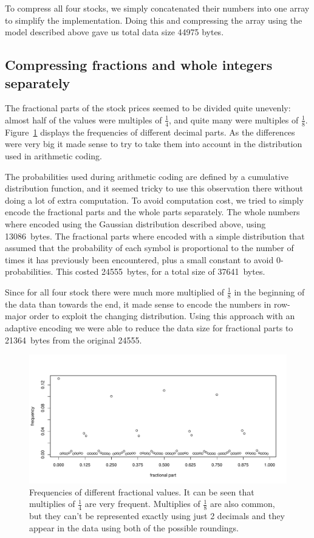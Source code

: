 \documentclass{article}
\begin{document}
To compress all four stocks, we simply concatenated their numbers into one array to simplify the implementation.
Doing this and compressing the array using the model described above gave us total data size 44975 bytes.

\subsection{Compressing fractions and whole integers separately}

The fractional parts of the stock prices seemed to be divided quite unevenly: almost half of the values were multiples of $\frac{1}{4}$, and quite many were multiples of $\frac{1}{8}$.
Figure~\ref{fig:frac} displays the frequencies of different decimal parts.
As the differences were very big it made sense to try to take them into account in the distribution used in arithmetic coding.

The probabilities used during arithmetic coding are defined by a cumulative distribution function, and it seemed tricky to use this observation there without doing a lot of extra computation.
To avoid computation cost, we tried to simply encode the fractional parts and the whole parts separately.
The whole numbers where encoded using the Gaussian distribution described above, using 13086~bytes.
The fractional parts where encoded with a simple distribution that assumed that the probability of each symbol is proportional to the number of times it has previously been encountered, plus a small constant to avoid 0-probabilities.
This costed 24555~bytes, for a total size of 37641~bytes.

Since for all four stock there were much more multiplied of $\frac{1}{8}$ in the beginning of the data than towards the end, it made sense to encode the numbers in row-major order to exploit the changing distribution.
Using this approach with an adaptive encoding we were able to reduce the data size for fractional parts to 21364~bytes from the original 24555.

\begin{figure}
	\includegraphics[scale=0.5]{frac.pdf}
	\caption{Frequencies of different fractional values. It can be seen that multiplies of $\frac{1}{4}$ are very frequent. Multiplies of $\frac{1}{8}$ are also common, but they can't be represented exactly using just 2 decimals and they appear in the data using both of the possible roundings.}
	\label{fig:frac}
\end{figure}
\end{document}
